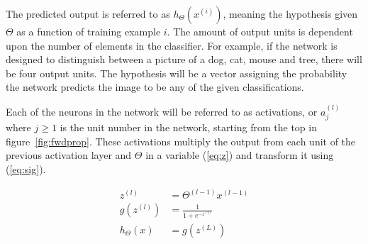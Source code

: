 The predicted output is referred to as $h_\Theta(x^{(i)})$, meaning the hypothesis given $\Theta$ as a function of training example $i$. The amount of output units is dependent upon the number of elements in the classifier.  For example, if the network is designed to distinguish between a picture of a dog, cat, mouse and tree, there will be four output units. The hypothesis will be a vector  assigning the probability the network predicts the image to be any of the given classifications.

Each of the neurons in the network will be referred to as activations, or $a_j^{(l)}$ where $j\ge1$ is the unit number in the network, starting from the top in figure~\ref{fig:fwdprop}. These activations multiply the output from each unit of the previous activation layer and $\Theta$ in a variable (\ref{eq:z}) and transform it using (\ref{eq:sig}).

\begin{align}
  z^{(l)} &= \Theta^{(l-1)}x^{(l-1)} \label{eq:z} \\ 
  g(z^{(l)}) &= \frac{1}{1+e^{-z^{(l)}}} \label{eq:sig} \\
  h_\Theta(x) &= g(z^{(L)})
\end{align}

